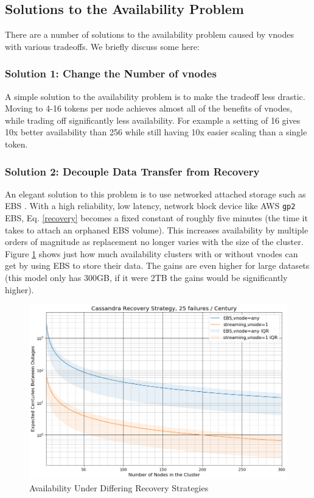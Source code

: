 \documentclass{article}
\begin{document}
\subsection{Solutions to the Availability Problem}
\label{sec:solutions}
There are a number of solutions to the availability problem caused by
vnodes with various tradeoffs. We briefly discuss some here:

\subsubsection{Solution 1: Change the Number of vnodes}
A simple solution to the availability problem is to make the tradeoff
less drastic. Moving to 4-16 tokens per node achieves almost all of the
benefits of vnodes, while trading off significantly less availability.
For example a setting of 16 gives 10x better availability than 256 while
still having 10x easier scaling than a single token.

\subsubsection{Solution 2: Decouple Data Transfer from Recovery}
An elegant solution to this problem is to use networked attached storage
such as EBS \cite{ebs}. With a high reliability, low latency, network
block device like AWS \texttt{gp2} EBS, Eq. \ref{recovery} becomes a
fixed constant of roughly five minutes (the time it takes to attach an
orphaned EBS volume). This increases availability by multiple orders of
magnitude as replacement no longer varies with the size of the cluster.
Figure \ref{fig:ebs} shows just how much availability clusters with or
without vnodes can get by using EBS to store their data. The gains are
even higher for large datasets (this model only has 300GB, if it were
2TB the gains would be significantly higher).

\begin{figure}[h!]
    \centering
    \includegraphics[width=1.0\textwidth]{images/recovery_strategy.png}
    \caption{Availability Under Differing Recovery Strategies}
    \label{fig:ebs}
\end{figure}
\end{document}
